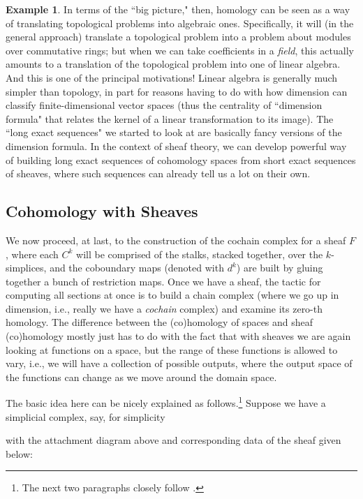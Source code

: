 \documentclass[11pt]{book}
\theoremstyle{definition}
\newtheorem{example}{Example}[section]
\theoremstyle{definition}
\theoremstyle{definition}
\theoremstyle{theorem}
\theoremstyle{definition}
\begin{document}
\begin{example}
	 	In terms of the ``big picture," then, homology can be seen as a way of translating topological problems into algebraic ones. Specifically, it will (in the general approach) translate a topological problem into a problem about modules over commutative rings; but when we can take coefficients in a \textit{field}, this actually amounts to a translation of the topological problem into one of linear algebra. And this is one of the principal motivations! Linear algebra is generally much simpler than topology, in part for reasons having to do with how dimension can classify finite-dimensional vector spaces (thus the centrality of ``dimension formula" that relates the kernel of a linear transformation to its image). The ``long exact sequences" we started to look at are basically fancy versions of the dimension formula. In the context of sheaf theory, we can develop powerful way of building long exact sequences of cohomology spaces from short exact sequences of sheaves, where such sequences can already tell us a lot on their own.  
\subsection{Cohomology with Sheaves}
	We now proceed, at last, to the construction of the cochain complex for a sheaf $F$, where each $C^k$ will be comprised of the stalks, stacked together, over the $k$-simplices, and the coboundary maps (denoted with $d^k$) are built by gluing together a bunch of restriction maps. Once we have a sheaf, the tactic for computing all sections at once is to build a chain complex (where we go up in dimension, i.e., really we have a \textit{cochain} complex) and examine its zero-th homology. The difference between the (co)homology of spaces and sheaf (co)homology mostly just has to do with the fact that with sheaves we are again looking at functions on a space, but the range of these functions is allowed to vary, i.e., we will have a collection of possible outputs, where the output space of the functions can change as we move around the domain space. \par 
	The basic idea here can be nicely explained as follows.\footnote{The next two paragraphs closely follow \cite{robinson_topological_2014}.} Suppose we have a simplicial complex, say, for simplicity 
	\begin{center} 
	 \end{center} \par \noindent 
with the attachment diagram above and corresponding data of the sheaf given below: 
\par 
\begin{center} 
\end{center}
\end{example}
\end{document}
